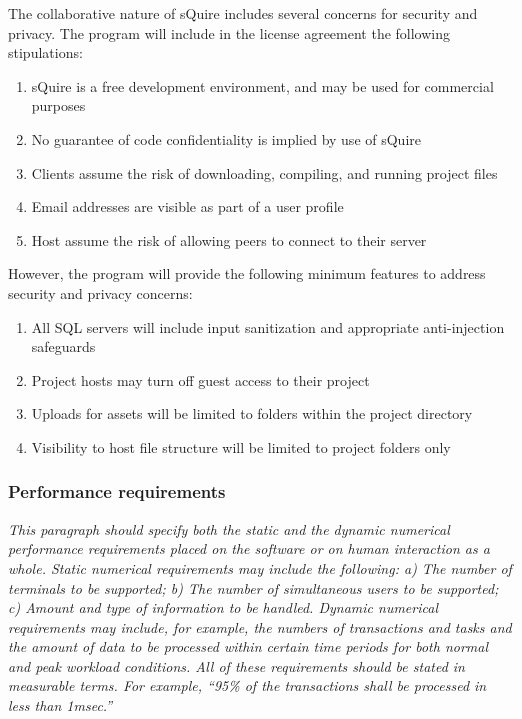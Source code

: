 \documentclass[twoside,letterpaper]{article}
\begin{document}
The collaborative nature of sQuire includes several concerns for security and privacy. The program will include in the license agreement the following stipulations:
\begin{enumerate}
  \item sQuire is a free development environment, and may be used for commercial purposes
  \item No guarantee of code confidentiality is implied by use of sQuire
  \item Clients assume the risk of downloading, compiling, and running project files
  \item Email addresses are visible as part of a user profile
  \item Host assume the risk of allowing peers to connect to their server
\end{enumerate}

However, the program will provide the following minimum features to address security and privacy concerns:
\begin{enumerate}
  \item All SQL servers will include input sanitization and appropriate anti-injection safeguards
  \item Project hosts may turn off guest access to their project
  \item Uploads for assets will be limited to folders within the project directory
  \item Visibility to host file structure will be limited to project folders only
\end{enumerate}

\subsubsection[Performance requirements]{\rmfamily\bfseries Performance
requirements}
\hypertarget{RefHeading18859017292}{}{\itshape
This paragraph should specify both the static and the dynamic
numerical performance requirements placed on the software
or on human interaction as a whole. Static numerical requirements
may include the following: a) The number of terminals to be supported;
b) The number of simultaneous users to be supported; c) Amount and
type of information to be handled. Dynamic numerical requirements
may include, for example, the numbers of transactions and tasks and the
amount of data to be processed within certain time periods for both
normal and peak workload conditions. All of these requirements should
be stated in measurable terms. For example, ``95\% of the transactions
shall be processed in less than 1msec.''}
\end{document}
